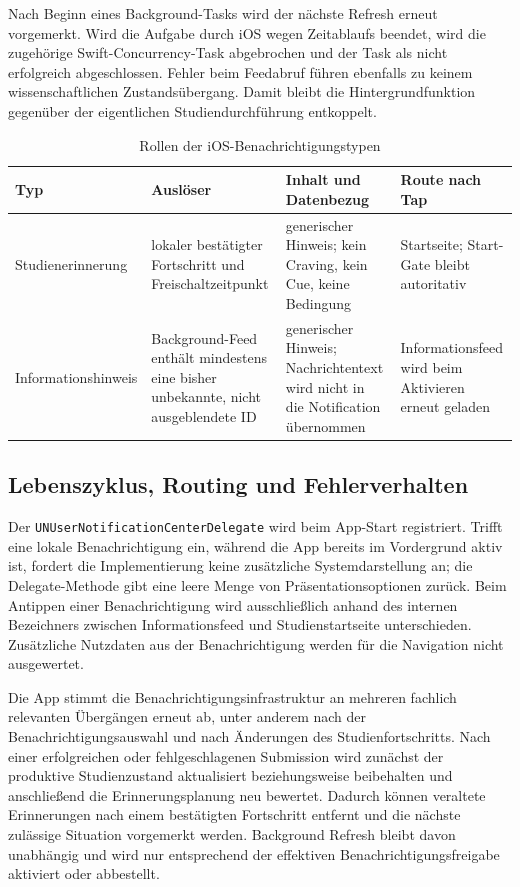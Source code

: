 \begin{neu}
Nach Beginn eines Background-Tasks wird der nächste Refresh erneut vorgemerkt. Wird die Aufgabe durch iOS wegen Zeitablaufs beendet, wird die zugehörige Swift-Concurrency-Task abgebrochen und der Task als nicht erfolgreich abgeschlossen. Fehler beim Feedabruf führen ebenfalls zu keinem wissenschaftlichen Zustandsübergang. Damit bleibt die Hintergrundfunktion gegenüber der eigentlichen Studiendurchführung entkoppelt.

\begin{table}[htbp]
\centering
\caption{Rollen der iOS-Benachrichtigungstypen}
\label{tab:ios-notification-types}
\begin{tabular}{p{}p{}p{}p{}}
\textbf{Typ} & \textbf{Auslöser} & \textbf{Inhalt und Datenbezug} & \textbf{Route nach Tap} \\
\hline
Studienerinnerung & lokaler bestätigter Fortschritt und Freischaltzeitpunkt & generischer Hinweis; kein Craving, kein Cue, keine Bedingung & Startseite; Start-Gate bleibt autoritativ \\
Informationshinweis & Background-Feed enthält mindestens eine bisher unbekannte, nicht ausgeblendete ID & generischer Hinweis; Nachrichtentext wird nicht in die Notification übernommen & Informationsfeed wird beim Aktivieren erneut geladen \\
\end{tabular}
\end{table}

\subsection{Lebenszyklus, Routing und Fehlerverhalten}

Der \texttt{UNUserNotificationCenterDelegate} wird beim App-Start registriert. Trifft eine lokale Benachrichtigung ein, während die App bereits im Vordergrund aktiv ist, fordert die Implementierung keine zusätzliche Systemdarstellung an; die Delegate-Methode gibt eine leere Menge von Präsentationsoptionen zurück. Beim Antippen einer Benachrichtigung wird ausschließlich anhand des internen Bezeichners zwischen Informationsfeed und Studienstartseite unterschieden. Zusätzliche Nutzdaten aus der Benachrichtigung werden für die Navigation nicht ausgewertet.

Die App stimmt die Benachrichtigungsinfrastruktur an mehreren fachlich relevanten Übergängen erneut ab, unter anderem nach der Benachrichtigungsauswahl und nach Änderungen des Studienfortschritts. Nach einer erfolgreichen oder fehlgeschlagenen Submission wird zunächst der produktive Studienzustand aktualisiert beziehungsweise beibehalten und anschließend die Erinnerungsplanung neu bewertet. Dadurch können veraltete Erinnerungen nach einem bestätigten Fortschritt entfernt und die nächste zulässige Situation vorgemerkt werden. Background Refresh bleibt davon unabhängig und wird nur entsprechend der effektiven Benachrichtigungsfreigabe aktiviert oder abbestellt.


\end{neu}
